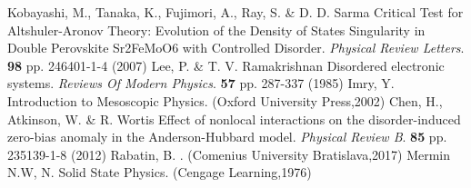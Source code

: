 \begin{thebibliography}{99}
Kobayashi, M., Tanaka, K., Fujimori, A., Ray, S. \& D. D. Sarma Critical Test for Altshuler-Aronov Theory: Evolution of the Density of States Singularity in Double Perovskite Sr2FeMoO6 with Controlled Disorder. {\em Physical Review Letters}. \textbf{98} pp. 246401-1-4 (2007)
Lee, P. \& T. V. Ramakrishnan Disordered electronic systems. {\em Reviews Of Modern Physics}. \textbf{57} pp. 287-337 (1985)
Imry, Y. Introduction to Mesoscopic Physics. (Oxford University Press,2002)
Chen, H., Atkinson, W. \& R. Wortis Effect of nonlocal interactions on the disorder-induced zero-bias anomaly in the Anderson-Hubbard model. {\em Physical Review B}. \textbf{85} pp. 235139-1-8 (2012)
Rabatin, B. . (Comenius University Bratislava,2017)
Mermin N.W, N. Solid State Physics. (Cengage Learning,1976)
  \end{thebibliography}